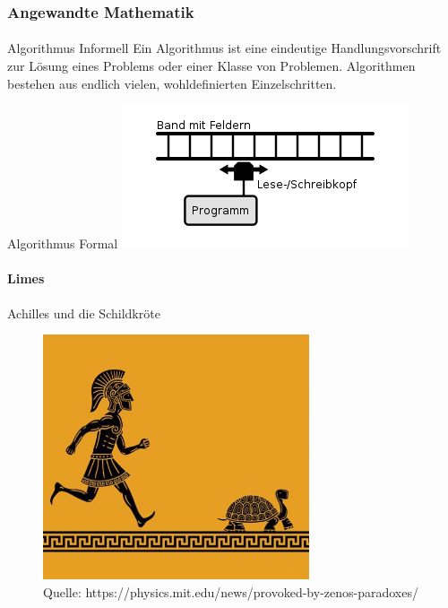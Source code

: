 \documentclass{beamer}
\begin{document}
\begin{frame}
    \frametitle{Angewandte Mathematik}
\framesubtitle{}
    \begin{block}{Algorithmus Informell}
Ein Algorithmus ist eine eindeutige Handlungsvorschrift zur Lösung eines Problems oder einer Klasse von Problemen. Algorithmen bestehen aus endlich vielen, wohldefinierten Einzelschritten.
\end{block}
    \begin{block}{Algorithmus Formal}
\includegraphics[scale=0.8]{images/Turingmaschine}
\end{block}
 \end{frame}


\begin{frame}
\framesubtitle{Limes}
    \begin{block}{Achilles und die Schildkröte}
\begin{figure}[H]
      \centering
    \includegraphics[width=0.7\textwidth]{images/archilles}
      \caption{Quelle: https://physics.mit.edu/news/provoked-by-zenos-paradoxes/}
\end{figure}
\end{block}

 \end{frame}
\end{document}
